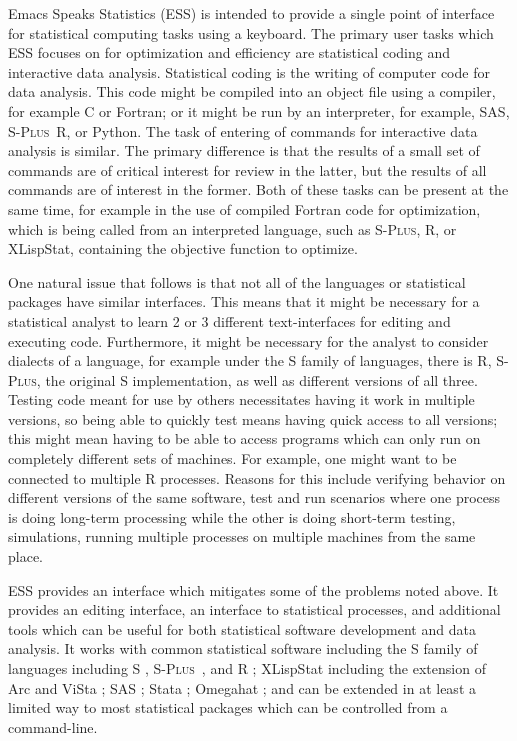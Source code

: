 \documentclass{article}
\newcommand*{\Splus}{\textsc{S-Plus}}
\begin{document}
Emacs Speaks Statistics (ESS) is intended to provide a single point of
interface for statistical computing tasks using a keyboard.  The
primary user tasks which ESS focuses on for optimization and
efficiency are statistical coding and interactive data analysis.
Statistical coding is the writing of computer code for data analysis.
This code might be compiled into an object file using a compiler, for
example C or Fortran; or it might be run by an interpreter, for
example, SAS, \Splus\, R, or Python.  The task of entering of commands
for interactive data analysis is similar.  The primary difference is
that the results of a small set of commands are of critical interest
for review in the latter, but the results of all commands are of
interest in the former.  Both of these tasks can be present at the
same time, for example in the use of compiled Fortran code for
optimization, which is being called from an interpreted language, such
as \Splus, R, or XLispStat, containing the objective function to
optimize.

One natural issue that follows is that not all of the languages or
statistical packages have similar interfaces.  This means that it
might be necessary for a statistical analyst to learn 2 or 3 different
text-interfaces for editing and executing code.  Furthermore, it might
be necessary for the analyst to consider dialects of a language, for
example under the S family of languages, there is R, \Splus, the
original S implementation, as well as different versions of all three.
Testing code meant for use by others necessitates having it work in
multiple versions, so being able to quickly test means having quick
access to all versions; this might mean having to be able to access
programs which can only run on completely different sets of machines.
For example, one might want to be connected to multiple R processes.
Reasons for this include verifying behavior on different versions of
the same software, test and run scenarios where one process is doing
long-term processing while the other is doing short-term testing,
simulations, running multiple processes on multiple machines from the
same place.

ESS provides an interface which mitigates some of the problems noted
above.  It provides an editing interface, an interface to statistical
processes, and additional tools which can be useful for both
statistical software development and data analysis.  It works with
common statistical software including the S family of languages
including S \citep{BecRCW88,ChaJH92,ChaJ98}, \Splus\ \citep{Splus},
and R \citep{ihak:gent:1996}; XLispStat \citep{Tier90} including the
extension of Arc \citep{Cook:Weisberg:1999} and ViSta
\citep{youn:fald:mcfa:1992}; SAS \citep{SAS:8.0}; Stata
\citep{Stata:6.0}; Omegahat \citep{DTLang:2000}; and can be extended
in at least a limited way to most statistical packages which can be
controlled from a command-line.
\end{document}
